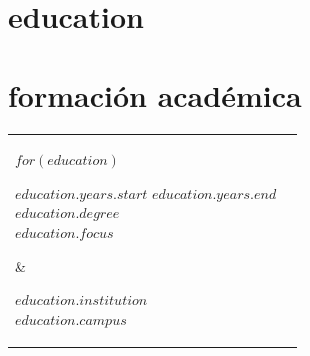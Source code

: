 \documentclass[letterpaper,12pt]{article}
\newcommand{\spacerule}{
    \addlinespace[0.5em]
    \midrule[0.5mm]
    \addlinespace[0.5em]
  }
\newcommand{\lightfont}[1]{{%
    {\hlight\color{light-gray}#1}
  }}
\newcommand{\lightsmall}[1]{{%
    {\fontsize{11pt}{14pt}\hlight\color{light-gray}#1}
  }}
\newcommand{\emphasized}[1]{{%
    {\fontsize{14pt}{18pt}\textbf{#1}}
  }}
\newcommand{\position}[1]{{%
    {\fontsize{14pt}{18pt} \hlight{#1}}
  }}
\newcommand{\company}[1]{{%
    {\fontsize{14pt}{18pt} \textbf{#1}}
  }}
\begin{document}
\begin{minipage}[t]{0.64\textwidth}
      {\section{education}}
      {\section{formación académica}}%
  \setlength{\hwide}{\dimexpr.5\hsize-4\tabcolsep}
  \setlength{\hwideright}{\dimexpr\hwide+5\tabcolsep}
  \setlength{\parskip}{1mm}
  \begin{tabular}{@{}p{\hwide}p{\rightwide}}
    $for(education)$
      \parbox[t][][t]{\hwide}{%
        \lightfont{$education.years.start$ \textendash{} $education.years.end$} \\
        \smallskip
        \emphasized{$education.degree$} \\
        \smallskip
        \emphasized{$education.focus$} \\
      } & %
      \parbox[t][][t]{\rightwide}{%
        \lightfont{\textbf{$education.institution$} \\
          \emph{$education.campus$}} \\ %
        \bigskip %
      } \\
    $endfor$
  \end{tabular}


\end{minipage}
\end{document}
